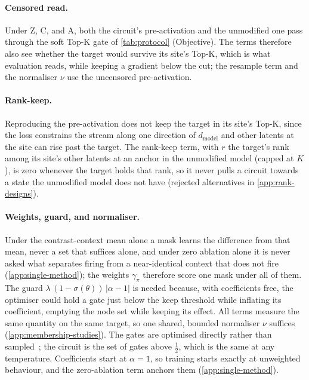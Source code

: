 \documentclass[10pt]{article}
\begin{document}
\paragraph{Censored read.}
Under Z, C, and A, both the circuit's pre-activation and the unmodified one pass through the soft Top-K gate of \cref{tab:protocol} (Objective).
The terms therefore also see whether the target would survive its site's Top-K, which is what evaluation reads, while keeping a gradient below the cut; the resample term and the normaliser $\nu$ use the uncensored pre-activation.

\paragraph{Rank-keep.}
Reproducing the pre-activation does not keep the target in its site's Top-K, since the loss constrains the stream along one direction of $d_{\mathrm{model}}$ and other latents at the site can rise past the target.
The rank-keep term, with $r$ the target's rank among its site's other latents at an anchor in the unmodified model (capped at $K$), is zero whenever the target holds that rank, so it never pulls a circuit towards a state the unmodified model does not have (rejected alternatives in \cref{app:rank-designs}).

\paragraph{Weights, guard, and normaliser.}
Under the contrast-context mean alone a mask learns the difference from that mean, never a set that suffices alone, and under zero ablation alone it is never asked what separates firing from a near-identical context that does not fire (\cref{app:single-method}); the weights $\gamma_{\pi}$ therefore score one mask under all of them.
The guard $\lambda\,(1 - \sigma(\theta))\,|\alpha - 1|$ is needed because, with coefficients free, the optimiser could hold a gate just below the keep threshold while inflating its coefficient, emptying the node set while keeping its effect.
All terms measure the same quantity on the same target, so one shared, bounded normaliser $\nu$ suffices (\cref{app:membership-studies}).
The gates are optimised directly rather than sampled~\citep{louizos2018learning, li2024optimal}; the circuit is the set of gates above $\tfrac{1}{2}$, which is the same at any temperature.
Coefficients start at $\alpha = 1$, so training starts exactly at unweighted behaviour, and the zero-ablation term anchors them (\cref{app:single-method}).
\end{document}
